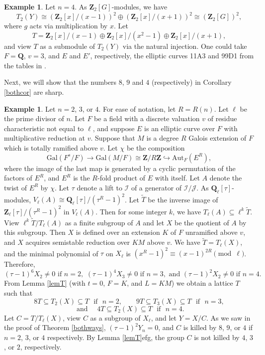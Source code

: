 \documentclass{amsart}
\def\Q{{\mathbf Q}}
\def\Z{{\mathbf Z}}
\def\Gal{\mathrm{Gal}}
\def\Aut{\mathrm{Aut}}
\def\I{{\mathcal I}}
\def\J{{\mathcal J}}
\theoremstyle{definition}
\newtheorem{ex}[thm]{Example}
\begin{document}
\begin{ex}
Let $n = 4$. 
As $\Z_{2}[G]$-modules, we have 
$$T_2(Y) \cong (\Z_2[x]/(x-1))^2 \oplus (\Z_2[x]/(x+1))^2 \cong 
(\Z_2[G])^2,$$
where $g$ acts via multiplication by $x$.
Let 
$$T = \Z_2[x]/(x-1) \oplus \Z_2[x]/(x^2-1) \oplus \Z_2[x]/(x+1),$$ 
and 
view $T$ as a submodule of $T_2(Y)$ via the natural injection.
One could take $F = \Q$, $v = 3$, 
and $E$ and $E'$, respectively, the elliptic curves 11A3 and
99D1 from the tables in \cite{Cremona}.
\end{ex}

Next, we will show that the numbers $8$, $9$ and $4$ (respectively) in
Corollary \ref{bothcor} are sharp.

\begin{ex}
Let $n = 2$, $3$, or $4$. For ease of notation, let $R = R(n)$. 
Let $\ell$ be the prime divisor of $n$. 
Let $F$ be a field with a discrete valuation $v$ of residue 
characteristic not equal to $\ell$, and suppose $E$ is an
elliptic curve over $F$ with multiplicative reduction at $v$.
Suppose that $M$ is a degree $R$ Galois extension of $F$ which is
totally ramified above $v$. Let $\chi$ be the composition
$$\Gal(F^{s}/F) \to \Gal(M/F) \cong \Z/R\Z \hookrightarrow
\Aut_{F}(E^{R}),$$
where the image of the last map is generated by a cyclic permutation
of the factors of $E^{R}$, and $E^{R}$ is the $R$-fold product
of $E$ with itself. 
Let $A$ denote the twist of $E^{R}$ by $\chi$. 
Let $\tau$ denote a lift to $\I$ of a generator of $\I/\J$.
As $\Q_{\ell}[\tau]$-modules, 
$V_{\ell}(A) \cong \Q_{\ell}[\tau]/(\tau^{R}-1)^{2}$.
Let ${\tilde T}$ be the 
inverse image of $\Z_{\ell}[\tau]/(\tau^{R}-1)^{2}$ in $V_{\ell}(A)$.
Then for some integer $k$, we have
$T_{\ell}(A) \subseteq \ell^{k}{\tilde T}$. View 
$\ell^{k}{\tilde T}/T_{\ell}(A)$ as a finite subgroup of $A$
and let $X$ be the quotient of $A$ by this subgroup. 
Then $X$ is defined over an extension $K$ of $F$ unramified above $v$,
and $X$ acquires semistable reduction over $KM$ above $v$. 
We have 
${\tilde T} = T_{\ell}(X)$, and the minimal polynomial of
$\tau$ on $X_{\ell}$ is $(x^{R}-1)^{2} \equiv (x-1)^{2R} \pmod{\ell}$. 
Therefore, 
$$(\tau - 1)^{6}X_{2} \ne 0 \text{ if } n = 2, \,\,
(\tau - 1)^{4}X_{3} \ne 0 \text{ if } n = 3, \text{ and }
(\tau - 1)^{2}X_{2} \ne 0 \text{ if } n = 4.$$   From
 Lemma \ref{lemT} (with $t = 0$,
$F = K$, and $L = KM$) we obtain a lattice $T$ such that 
$$8T \subseteq T_{2}(X) \subseteq T \,\, \text{ if } \,\,  n = 2, \qquad
9T \subseteq T_{3}(X) \subseteq T \,\, \text{ if }\,\,  n = 3,$$ 
$$\text{ and }
\quad 4T \subseteq T_{2}(X) \subseteq T \,\,  \text{ if } \,\,  n = 4.$$
Let $C = T/T_{\ell}(X)$, view $C$ as a subgroup of $X_{\ell}$, 
and let $Y = X/C$. As we saw in the proof of Theorem \ref{bothways},
$(\tau - 1)^{2}Y_{n} = 0$, and
$C$ is killed by $8$, $9$, or $4$ if $n = 2$, $3$, or $4$ respectively.
By Lemma \ref{lemT}efg, the group $C$ is not killed by
$4$, $3$, or $2$, respectively.


\end{ex}
\end{document}
